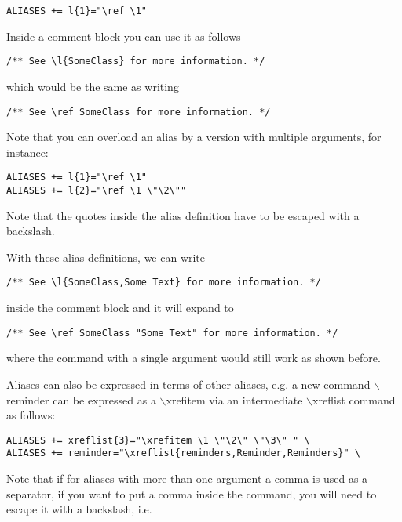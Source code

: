 \footnotesize\begin{verbatim}
ALIASES += l{1}="\ref \1"
\end{verbatim}
\normalsize


Inside a comment block you can use it as follows 

\footnotesize\begin{verbatim}
/** See \l{SomeClass} for more information. */
\end{verbatim}
\normalsize
 which would be the same as writing 

\footnotesize\begin{verbatim}
/** See \ref SomeClass for more information. */
\end{verbatim}
\normalsize


Note that you can overload an alias by a version with multiple arguments, for instance: 

\footnotesize\begin{verbatim}
ALIASES += l{1}="\ref \1"
ALIASES += l{2}="\ref \1 \"\2\""
\end{verbatim}
\normalsize
 Note that the quotes inside the alias definition have to be escaped with a backslash.

With these alias definitions, we can write 

\footnotesize\begin{verbatim}
/** See \l{SomeClass,Some Text} for more information. */
\end{verbatim}
\normalsize
 inside the comment block and it will expand to 

\footnotesize\begin{verbatim}
/** See \ref SomeClass "Some Text" for more information. */
\end{verbatim}
\normalsize
 where the command with a single argument would still work as shown before.

Aliases can also be expressed in terms of other aliases, e.g. a new command $\backslash$reminder can be expressed as a $\backslash$xrefitem via an intermediate $\backslash$xreflist command as follows: 

\footnotesize\begin{verbatim}
ALIASES += xreflist{3}="\xrefitem \1 \"\2\" \"\3\" " \
ALIASES += reminder="\xreflist{reminders,Reminder,Reminders}" \
\end{verbatim}
\normalsize


Note that if for aliases with more than one argument a comma is used as a separator, if you want to put a comma inside the command, you will need to escape it with a backslash, i.e. 


